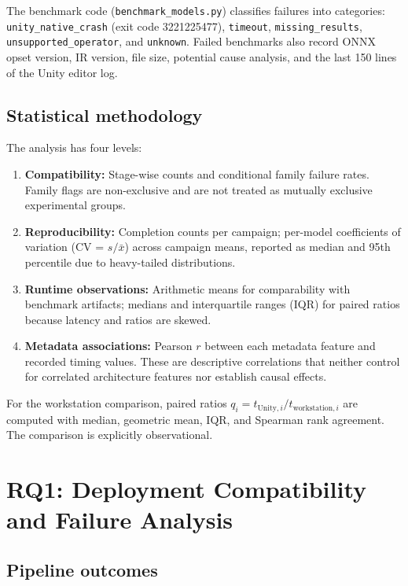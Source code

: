 \documentclass[10pt,twocolumn,letterpaper]{article}
\begin{document}
The benchmark code (\texttt{benchmark\_models.py}) classifies failures into categories: \texttt{unity\_native\_crash} (exit code 3221225477), \texttt{timeout}, \texttt{missing\_results}, \texttt{unsupported\_operator}, and \texttt{unknown}. Failed benchmarks also record ONNX opset version, IR version, file size, potential cause analysis, and the last 150 lines of the Unity editor log.

\subsection{Statistical methodology}

The analysis has four levels:
\begin{enumerate}[nosep,leftmargin=*]
  \item \textbf{Compatibility:} Stage-wise counts and conditional family failure rates. Family flags are non-exclusive and are not treated as mutually exclusive experimental groups.
  \item \textbf{Reproducibility:} Completion counts per campaign; per-model coefficients of variation (CV = $s/\bar{x}$) across campaign means, reported as median and 95th percentile due to heavy-tailed distributions.
  \item \textbf{Runtime observations:} Arithmetic means for comparability with benchmark artifacts; medians and interquartile ranges (IQR) for paired ratios because latency and ratios are skewed.
  \item \textbf{Metadata associations:} Pearson $r$ between each metadata feature and recorded timing values. These are descriptive correlations that neither control for correlated architecture features nor establish causal effects.
\end{enumerate}

For the workstation comparison, paired ratios $q_i = t_{\mathrm{Unity},i} / t_{\mathrm{workstation},i}$ are computed with median, geometric mean, IQR, and Spearman rank agreement. The comparison is explicitly observational.

\section{RQ1: Deployment Compatibility and Failure Analysis}\label{sec:rq1}

\subsection{Pipeline outcomes}
\end{document}
